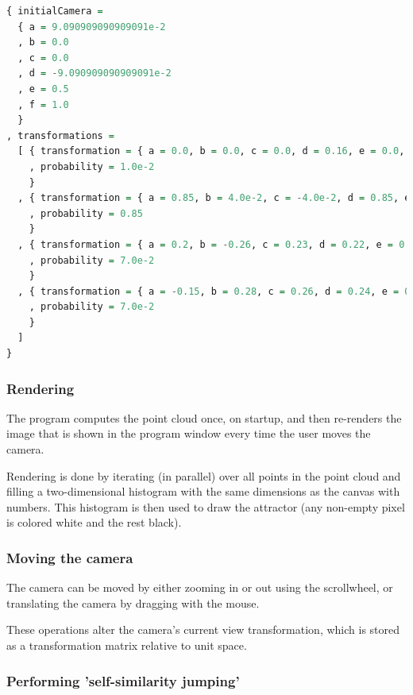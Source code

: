 \documentclass[11pt]{article}
\begin{document}
\begin{lstlisting}[float, language=Haskell, frame=single, breaklines=true, basicstyle=\scriptsize\tt, captionpos=b, caption={barnsley\_fern.ifs, representing \autoref{ifs:barnsley_fern}}, label={listing:barnsley_fern_ifs_file}]
{ initialCamera =
  { a = 9.090909090909091e-2
  , b = 0.0
  , c = 0.0
  , d = -9.090909090909091e-2
  , e = 0.5
  , f = 1.0
  }
, transformations =
  [ { transformation = { a = 0.0, b = 0.0, c = 0.0, d = 0.16, e = 0.0, f = 0.0 }
    , probability = 1.0e-2
    }
  , { transformation = { a = 0.85, b = 4.0e-2, c = -4.0e-2, d = 0.85, e = 0.0, f = 1.6 }
    , probability = 0.85
    }
  , { transformation = { a = 0.2, b = -0.26, c = 0.23, d = 0.22, e = 0.0, f = 1.6 }
    , probability = 7.0e-2
    }
  , { transformation = { a = -0.15, b = 0.28, c = 0.26, d = 0.24, e = 0.0, f = 0.44 }
    , probability = 7.0e-2
    }
  ]
}

\end{lstlisting}

\subsubsection{Rendering}
\label{sec:orgd092a71}
The program computes the point cloud once, on startup, and then re-renders the image that is shown in the program window
every time the user moves the camera.

Rendering is done by iterating (in parallel) over all points in the point cloud and filling a two-dimensional histogram with the same dimensions
as the canvas with numbers. 
This histogram is then used to draw the attractor (any non-empty pixel is colored white and the rest black).

\subsubsection{Moving the camera}
\label{sec:org54d4ae4}
The camera can be moved by either zooming in or out using the scrollwheel,
or translating the camera by dragging with the mouse.

These operations alter the camera's current view transformation, 
which is stored as a transformation matrix relative to unit space.

\subsubsection{Performing 'self-similarity jumping'}
\label{sec:orgd28cb11}
\end{document}
